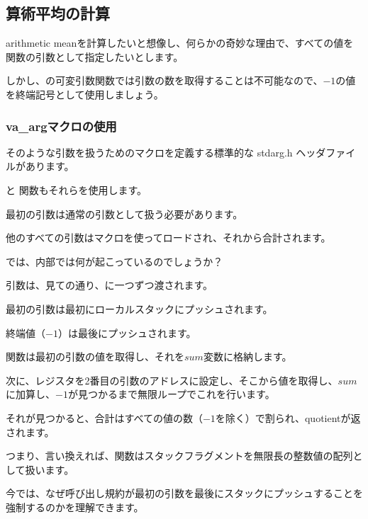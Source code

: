\subsection{算術平均の計算}

\gls{arithmetic mean}を計算したいと想像し、何らかの奇妙な理由で、すべての値を関数の引数として指定したいとします。

しかし、\CCpp の可変引数関数では引数の数を取得することは不可能なので、$-1$の値を終端記号として使用しましょう。

\subsubsection{va\_argマクロの使用}

そのような引数を扱うためのマクロを定義する標準的な stdarg.h ヘッダファイルがあります。

\printf と \scanf 関数もそれらを使用します。



最初の引数は通常の引数として扱う必要があります。

他のすべての引数はマクロを使ってロードされ、それから合計されます。

では、内部では何が起こっているのでしょうか？




引数は、見ての通り、\main に一つずつ渡されます。

最初の引数は最初にローカルスタックにプッシュされます。

終端値（$-1$）は最後にプッシュされます。

関数は最初の引数の値を取得し、それを$sum$変数に格納します。

次に、\EDX レジスタを2番目の引数のアドレスに設定し、そこから値を取得し、$sum$に加算し、$-1$が見つかるまで無限ループでこれを行います。

それが見つかると、合計はすべての値の数（$-1$を除く）で割られ、\gls{quotient}が返されます。

つまり、言い換えれば、関数はスタックフラグメントを無限長の整数値の配列として扱います。

今では、なぜ呼び出し規約が最初の引数を最後にスタックにプッシュすることを強制するのかを理解できます。

